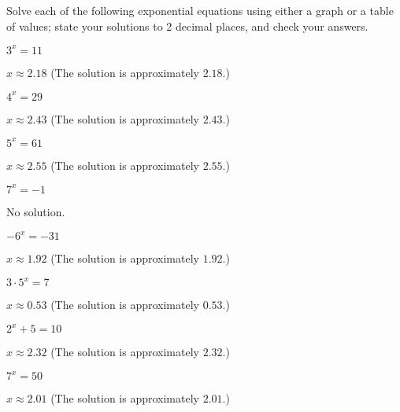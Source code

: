 \begin{exercises}
\begin{problem}
Solve each of the following exponential equations using either a graph 
or a table of values; state your solutions to 2 decimal places, and check your answers. 
\begin{multicols}{4}
	\begin{subproblem}
		$3^x=11$
		\begin{shortsolution}
			$x\approx 2.18$ (The solution is approximately $2.18$.)
		\end{shortsolution}
	\end{subproblem}
	\begin{subproblem}
		$4^x=29$
		\begin{shortsolution}
			$x\approx 2.43$ (The solution is approximately $2.43$.)
		\end{shortsolution}
	\end{subproblem}
	\begin{subproblem}
		$5^x=61$
		\begin{shortsolution}
			$x\approx 2.55$ (The solution is approximately $2.55$.)
		\end{shortsolution}
	\end{subproblem}
	\begin{subproblem}
		$7^x=-1$
		\begin{shortsolution}
			No solution.
		\end{shortsolution}
	\end{subproblem}
	\begin{subproblem}
		$-6^x = -31$
		\begin{shortsolution}
			$x\approx 1.92$ (The solution is approximately $1.92$.)
		\end{shortsolution}
	\end{subproblem}
	\begin{subproblem}
		$3\cdot 5^x = 7$
		\begin{shortsolution}
			$x\approx 0.53$ (The solution is approximately $0.53$.)
		\end{shortsolution}
	\end{subproblem}
	\begin{subproblem}
		$2^x+5 = 10$
		\begin{shortsolution}
			$x\approx 2.32$ (The solution is approximately $2.32$.)
		\end{shortsolution}
	\end{subproblem}
	\begin{subproblem}
		$7^x=50$
		\begin{shortsolution}
			$x\approx 2.01$ (The solution is approximately $2.01$.)
		\end{shortsolution}
	\end{subproblem}
\end{multicols}
\end{problem}


\end{exercises}
